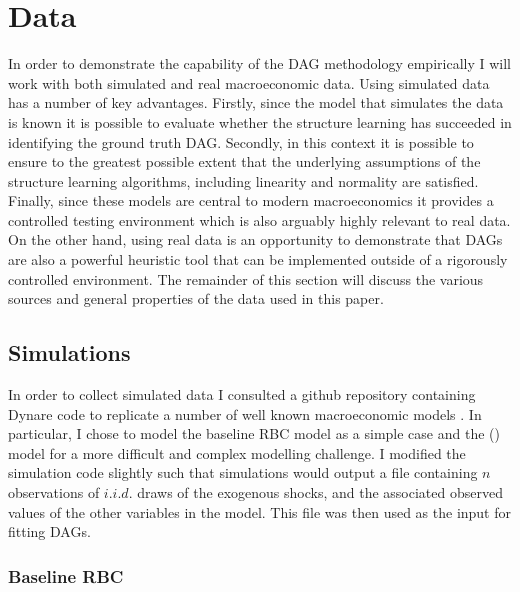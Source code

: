 \documentclass{article}
\begin{document}
\section{Data}

In order to demonstrate the capability of the DAG methodology empirically I will work with both simulated and real macroeconomic data. Using simulated data has a number of key advantages. Firstly, since the model that simulates the data is known it is possible to evaluate whether the structure learning has succeeded in identifying the ground truth DAG. Secondly, in this context it is possible to ensure to the greatest possible extent that the underlying assumptions of the structure learning algorithms, including linearity and normality are satisfied. Finally, since these models are central to modern macroeconomics it provides a controlled testing environment which is also arguably highly relevant to real data. On the other hand, using real data is an opportunity to demonstrate that DAGs are also a powerful heuristic tool that can be implemented outside of a rigorously controlled environment. The remainder of this section will discuss the various sources and general properties of the data used in this paper.

\subsection{Simulations}

In order to collect simulated data I consulted a github repository containing Dynare code to replicate a number of well known macroeconomic models \parencite{pfeifer2020}. In particular, I chose to model the baseline RBC model as a simple case and the \citeauthor{smets2007shocks} (\citeyear{smets2007shocks}) model for a more difficult and complex modelling challenge. I modified the simulation code slightly such that simulations would output a file containing $n$ observations of $i.i.d.$ draws of the exogenous shocks, and the associated observed values of the other variables in the model. This file was then used as the input for fitting DAGs.

\subsubsection{Baseline RBC}
\end{document}
